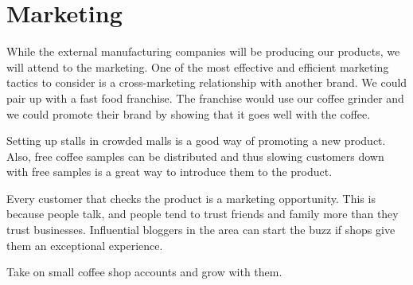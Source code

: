 \chapter*{Marketing}

\noindent While the external manufacturing companies will be producing our products, we will attend to the marketing. One of the most effective and efficient marketing tactics to consider is a cross-marketing relationship with another brand. We could pair up with a fast food franchise. The franchise would use our coffee grinder and we could promote their brand by showing that it goes well with the coffee.

\noindent Setting up stalls in crowded malls is a good way of promoting a new product. Also, free coffee samples can be distributed and thus slowing customers down with free samples is a great way to introduce them to the product.

\noindent Every customer that checks the product is a marketing opportunity. This is because people talk, and people tend to trust friends and family more than they trust businesses. Influential bloggers in the area can start the buzz if shops give them an exceptional experience.

\noindent Take on small coffee shop accounts and grow with them.
